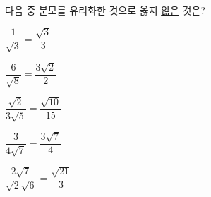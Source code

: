 다음 중 분모를 유리화한 것으로 옳지 \underline{않은} 것은?
\begin{choicesii}{\rule[-3ex]{0pt}{8ex}$\dfrac{1}{\sqrt{3}}=\dfrac{\sqrt{3}}{3}$}{\rule[-3ex]{0pt}{8ex}$\dfrac{6}{\sqrt{8}}=\dfrac{3\sqrt{2}}{2}$}{\rule[-3ex]{0pt}{8ex}$\dfrac{\sqrt{2}}{3\sqrt{5}}=\dfrac{\sqrt{10}}{15}$}{\rule[-3ex]{0pt}{8ex}$\dfrac{3}{4\sqrt{7}}=\dfrac{3\sqrt{7}}{4}$}{\rule[-3ex]{0pt}{8ex}$\dfrac{2\sqrt{7}}{\sqrt{2}\sqrt{6}}=\dfrac{\sqrt{21}}{3}$}\end{choicesii}
